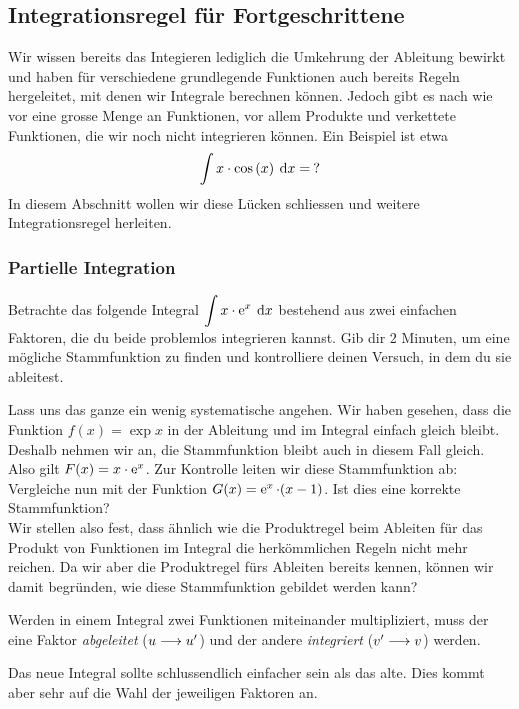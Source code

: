 \newpage
\subsection{Integrationsregel für Fortgeschrittene}
	Wir wissen bereits das Integieren lediglich die Umkehrung der Ableitung bewirkt und haben für verschiedene grundlegende Funktionen auch bereits Regeln hergeleitet, mit denen wir Integrale berechnen können. Jedoch gibt es nach wie vor eine grosse Menge an Funktionen, vor allem Produkte und verkettete Funktionen, die wir noch nicht integrieren können. Ein Beispiel ist etwa \[\int x\*\cos{x}\d{x}=\:?\] In diesem Abschnitt wollen wir diese Lücken schliessen und weitere Integrationsregel herleiten.
\subsubsection{Partielle Integration}
	\vspace{5pt}
	\begin{aufgabe}
		Betrachte das folgende Integral $\displaystyle\int x\cdot\operatorname{\operatorname{e}}^{x}\:\operatorname{d}\!{x}$ bestehend aus zwei einfachen Faktoren, die du beide problemlos integrieren kannst. Gib dir $2$ Minuten, um eine mögliche Stammfunktion zu finden und kontrolliere deinen Versuch, in dem du sie ableitest.\\[5pt]
	\end{aufgabe}
	Lass uns das ganze ein wenig systematische angehen. Wir haben gesehen, dass die Funktion $f(x)=\exp{x}$ in der Ableitung und im Integral einfach gleich bleibt. Deshalb nehmen wir an, die Stammfunktion bleibt auch in diesem Fall gleich. Also gilt $F(x)=x\cdot\operatorname{\operatorname{e}}^{x}$. Zur Kontrolle leiten wir diese Stammfunktion ab: \\[5pt]
	Vergleiche nun mit der Funktion $G(x)=\operatorname{\operatorname{e}}^{x}\cdot(x-1)$. Ist dies eine korrekte Stammfunktion? \\[5pt]
	Wir stellen also fest, dass ähnlich wie die Produktregel beim Ableiten für das Produkt von Funktionen im Integral die herkömmlichen Regeln nicht mehr reichen. Da wir aber die Produktregel fürs Ableiten bereits kennen, können wir damit begründen, wie diese Stammfunktion gebildet werden kann?\\[5pt]
	\begin{satz}\label{satz:partielleIntegration}
		Werden in einem Integral zwei Funktionen miteinander multipliziert, muss der eine Faktor \emph{abgeleitet} ($u\longrightarrow u'$) und der andere \emph{integriert} ($v'\longrightarrow v$) werden.
		{\begin{center}\end{center}}
		Das neue Integral sollte schlussendlich einfacher sein als das alte. Dies kommt aber sehr auf die Wahl der jeweiligen Faktoren an.
	\end{satz}
